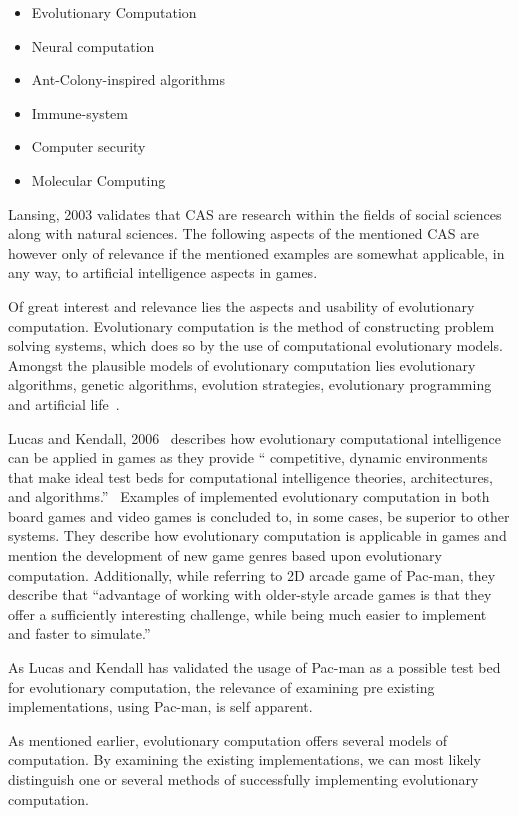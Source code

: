 	\begin{itemize}
	\item Evolutionary Computation
	\item Neural computation
	\item Ant-Colony-inspired algorithms
	\item Immune-system
	\item Computer security
	\item Molecular Computing
	 \end{itemize}

Lansing, 2003 \cite{Lansing2003} validates that CAS are research within the fields of social sciences along with natural sciences.  The following aspects of the mentioned CAS are however only of relevance if the mentioned examples are somewhat applicable, in any way, to artificial intelligence aspects in games.

Of great interest and relevance lies the aspects and usability of evolutionary computation. Evolutionary computation is the method of constructing problem solving systems, which does so by the use of computational evolutionary models.\cite{Howe2010} Amongst the plausible models of evolutionary computation lies evolutionary algorithms, genetic algorithms, evolution strategies, evolutionary programming and artificial life~\cite{Howe2010}.

Lucas and Kendall, 2006~\cite{Lucas2006} describes how evolutionary computational intelligence can be applied in games as they provide \enquote{ competitive, dynamic environments that make ideal test beds for computational intelligence theories, architectures, and algorithms.}~\cite[pp. 10]{Lucas2006}
Examples of implemented evolutionary computation in both board games and video games is concluded to, in some cases, be superior to other systems. They describe how evolutionary computation is applicable in games and mention the development of new game genres based upon evolutionary computation. Additionally, while referring to 2D arcade game of Pac-man, they describe that \enquote{advantage of working with older-style arcade games is that they offer a sufficiently interesting challenge, while being much easier to implement and faster to simulate.} \cite[pp 15]{Lucas2006}

As Lucas and Kendall has validated the usage of Pac-man as a possible test bed for evolutionary computation, the relevance of examining pre existing implementations, using Pac-man, is self apparent.

As mentioned earlier, evolutionary computation offers several models of computation. By examining the existing implementations, we can most likely distinguish one or several methods of successfully implementing evolutionary computation.

